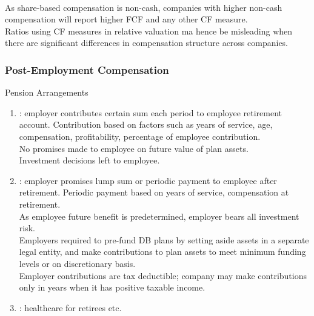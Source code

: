 \begin{remark} \\
As share-based compensation is non-cash, companies with higher non-cash compensation will report higher FCF and any other CF measure.\\
Ratios using CF measures in relative valuation ma hence be misleading when there are significant differences in compensation structure across companies.
\end{remark}

\subsubsection{Post-Employment Compensation}

\begin{definition} Pension Arrangements
\begin{enumerate}[label=\roman*.]
\setlength{\itemsep}{0pt}
\item {}: employer contributes certain sum each period to employee retirement account. Contribution based on factors such as years of service, age, compensation, profitability, percentage of employee contribution.\\
No promises made to employee on future value of plan assets.\\
Investment decisions left to employee.
\item {}: employer promises lump sum or periodic payment to employee after retirement. Periodic payment based on years of service, compensation at retirement.\\
As employee future benefit is predetermined, employer bears all investment risk.\\
Employers required to pre-fund DB plans by setting aside assets in a separate legal entity, and make contributions to plan assets to meet minimum funding levels or on discretionary basis.\\
Employer contributions are tax deductible; company may make contributions only in years when it has positive taxable income.
\item {}: healthcare for retirees etc.
\end{enumerate}
\end{definition}

